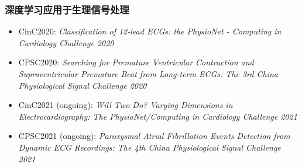 \begin{frame}
{\begin{figure}
\end{figure}
}


\end{frame}


\begin{frame}
\frametitle{深度学习应用于生理信号处理}

\begin{itemize}
\item<1-> CinC2020: \textit{\scriptsize Classification of 12-lead ECGs: the PhysioNet - Computing in Cardiology Challenge 2020}
\item<1-> {\color{red} CPSC2020}: \textit{\scriptsize Searching for Premature Ventricular Contraction and Supraventricular Premature Beat from Long-term ECGs: The 3rd China Physiological Signal Challenge 2020}


\item<1-> \fl CinC2021 {\scriptsize (ongoing)}: \textit{\scriptsize Will Two Do? Varying Dimensions in Electrocardiography: The PhysioNet/Computing in Cardiology Challenge 2021}
\item<1-> CPSC2021 {\scriptsize (ongoing)}: \textit{\scriptsize Paroxysmal Atrial Fibrillation Events Detection from Dynamic ECG Recordings: The 4th China Physiological Signal Challenge 2021}
\end{itemize}

\end{frame}


